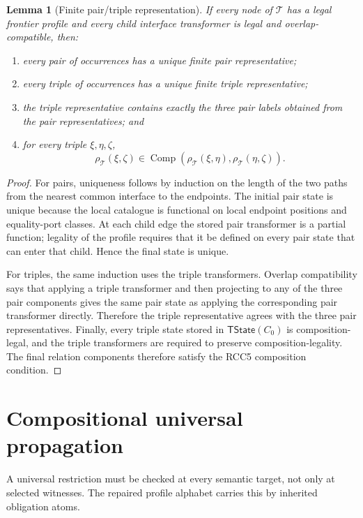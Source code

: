 \documentclass[11pt]{article}
\newtheorem{lemma}[theorem]{Lemma}
\newcommand{\Comp}{\operatorname{Comp}}
\begin{document}
\begin{lemma}[Finite pair/triple representation]
If every node of $\mathcal T$ has a legal frontier profile and every child interface transformer is legal and overlap-compatible, then:
\begin{enumerate}[label=(F\arabic*)]
\item every pair of occurrences has a unique finite pair representative;
\item every triple of occurrences has a unique finite triple representative;
\item the triple representative contains exactly the three pair labels obtained from the pair representatives; and
\item for every triple $\xi,\eta,\zeta$,
\[
  \rho_\mathcal T(\xi,\zeta)
  \in
  \Comp(\rho_\mathcal T(\xi,\eta),\rho_\mathcal T(\eta,\zeta)).
\]
\end{enumerate}
\end{lemma}

\begin{proof}
For pairs, uniqueness follows by induction on the length of the two paths from the nearest common interface to the endpoints.  The initial pair state is unique because the local catalogue is functional on local endpoint positions and equality-port classes.  At each child edge the stored pair transformer is a partial function; legality of the profile requires that it be defined on every pair state that can enter that child.  Hence the final state is unique.

For triples, the same induction uses the triple transformers.  Overlap compatibility says that applying a triple transformer and then projecting to any of the three pair components gives the same pair state as applying the corresponding pair transformer directly.  Therefore the triple representative agrees with the three pair representatives.  Finally, every triple state stored in $\mathsf{TState}(C_0)$ is composition-legal, and the triple transformers are required to preserve composition-legality.  The final relation components therefore satisfy the RCC5 composition condition.
\end{proof}

\section{Compositional universal propagation}

A universal restriction must be checked at every semantic target, not only at selected witnesses.  The repaired profile alphabet carries this by inherited obligation atoms.
\end{document}
